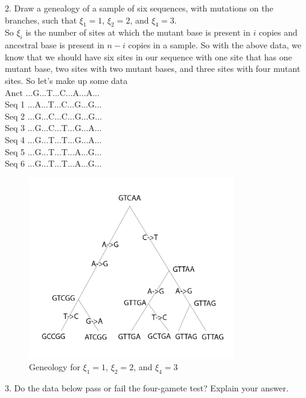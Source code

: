 \documentclass[11pt, oneside]{article}
\begin{document}
2. Draw a genealogy of a sample of six sequences, with mutations on the branches, such that
$\xi_1=1$, $\xi_2=2$, and $\xi_4=3$.\\

So $\xi_i$ is the number of sites at which the mutant base is present in $i$ copies and 
ancestral base is present in $n-i$ copies in a sample. So with the above data, we know that
we should have six sites in our sequence with one site that has one mutant base, two sites with 
two mutant bases, and three sites with four mutant sites. So let's make up some data\\

\noindent
Anct			...G...T...C...A...A...\\
Seq 1   		...A...T...C...G...G...\\
Seq 2		...G...C...C...G...G...\\	
Seq 3	  	...G...C...T...G...A...\\
Seq 4  		...G...T...T...G...A...\\
Seq 5  		...G...T...T...A...G...\\
Seq 6  		...G...T...T...A...G...\\



\begin{figure}[!htbp]
    \centering
    \includegraphics[width=0.8\textwidth]{./Figures/Ch1Q2.jpg}
    \caption{Geneology for $\xi_1=1$, $\xi_2=2$, and $\xi_4=3$}
    \label{fig:Ch1Q6gen}
\end{figure}




3. Do the data below pass or fail the four-gamete test? Explain your answer. \\
\end{document}
